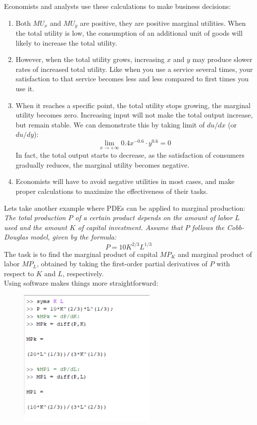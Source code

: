 \documentclass[a4paper]{article}
\begin{document}
Economists and analysts use these calculations to make business decisions:
\begin{enumerate}[label=$\bullet$]
	\item Both $MU_x$ and $MU_y$ are positive, they are positive marginal utilities. When the total utility is low, the consumption of an additional unit of goods will likely to increase the total utility.
	\item However, when the total utility grows, increasing $x$ and $y$ may produce slower rates of increased total utility. Like when you use a service several times, your satisfaction to that service becomes less and less compared to first times you use it.
	\item When it reaches a specific point, the total utility stops growing, the marginal utility becomes zero. Increasing input will not make the total output increase, but remain stable. We can demonstrate this by taking limit of $du/dx$ (or $du/dy$):
	      \begin{equation*}
		      \lim\limits_{x \to +\infty} 0.4x^{-0.6}\cdot y^{0.6} = 0
	      \end{equation*}
	      In fact, the total output starts to decrease, as the satisfaction of consumers gradually reduces, the marginal utility becomes negative. 
	\item Economists will have to avoid negative utilities in most cases, and make proper calculations to maximize the effectiveness of their tasks.
\end{enumerate}
Lets take another example where PDEs can be applied to marginal production: \\
\emph{The total production $P$ of a certain product depends on the amount of labor $L$ used and the amount $K$ of capital investment. Assume that $P$ follows the Cobb-Douglas model, given by the formula:}
\begin{equation*}
	P = 10K^{2/3}L^{1/3}
\end{equation*}
The task is to find the marginal product of capital $MP_K$ and marginal product of labor $MP_L$, obtained by taking the first-order partial derivatives of $P$ with respect to $K$ and $L$, respectively. \\
Using software makes things more straightforward:
\begin{figure}[H]
	\centering
	\includegraphics[width = 0.6\textwidth]{PDE2.png}
\end{figure}
\end{document}
